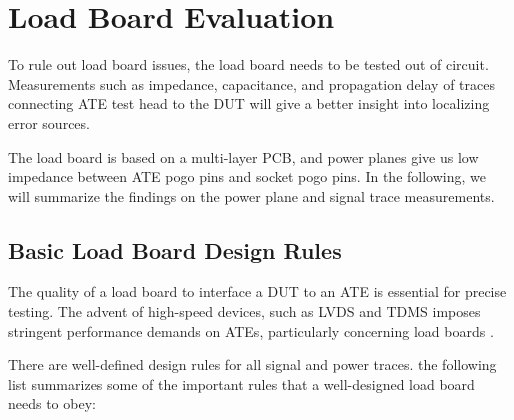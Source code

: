 

\section{Load Board Evaluation}
\label{sec:loadboard-evaluation}

To rule out load board issues, the load board needs to be
tested out of circuit.
Measurements such as impedance, capacitance, and propagation delay of traces
connecting \ac{ATE} test head to the \ac{DUT} will give a better insight into
localizing error sources.

The load board is based on a multi-layer PCB, and power planes give us low
impedance between ATE pogo pins and socket pogo pins.
In the following, we will summarize the findings on the power plane and signal
trace measurements.

\subsection{Basic Load Board Design Rules}
\label{basic-load-board-design-rules}

The quality of a load board to interface a \ac{DUT} to an \ac{ATE} is
essential for precise testing.
The advent of high-speed devices, such as \ac{LVDS} and \ac{TDMS} imposes
stringent performance demands on \acp{ATE}, particularly concerning
load boards \autocite{1041807}.

There are well-defined design rules for all signal and power traces.
the following list summarizes some of the important rules that a
well-designed load board needs to obey:

